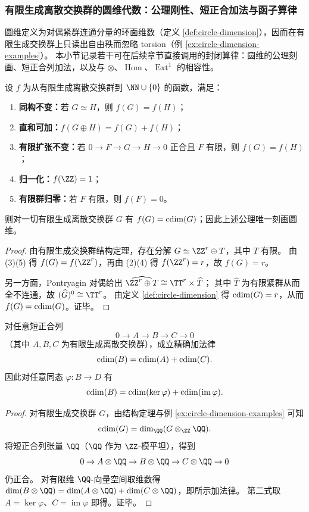 \subsubsection{有限生成离散交换群的圆维代数：公理刚性、短正合加法与函子算律}\label{subsubsec:cdim-fg-abelian-calculus}
圆维定义为对偶紧群连通分量的环面维数（定义 \ref{def:circle-dimension}），因而在有限生成交换群上只读出自由秩而忽略 torsion（例 \ref{ex:circle-dimension-examples}）。
本小节记录若干可在后续章节直接调用的封闭算律：圆维的公理刻画、短正合列加法，以及与 \(\otimes\)、\(\operatorname{Hom}\)、\(\operatorname{Ext}^1\) 的相容性。

\begin{theorem}[圆维的公理刚性与不可替代性]\label{thm:cdim-axiomatic-rigidity}
设 \(f\) 为从有限生成离散交换群到 \(\NN\cup\{0\}\) 的函数，满足：
\begin{enumerate}
  \item \textbf{同构不变：}若 \(G\simeq H\)，则 \(f(G)=f(H)\)；
  \item \textbf{直和可加：}\(f(G\oplus H)=f(G)+f(H)\)；
  \item \textbf{有限扩张不变：}若 \(0\to F\to G\to H\to 0\) 正合且 \(F\) 有限，则 \(f(G)=f(H)\)；
  \item \textbf{归一化：}\(f(\ZZ)=1\)；
  \item \textbf{有限群归零：}若 \(F\) 有限，则 \(f(F)=0\)。
\end{enumerate}
则对一切有限生成离散交换群 \(G\) 有 \(f(G)=\operatorname{cdim}(G)\)；因此上述公理唯一刻画圆维。
\end{theorem}
\begin{proof}
由有限生成交换群结构定理，存在分解 \(G\simeq \ZZ^{r}\oplus T\)，其中 \(T\) 有限。
由 (3)(5) 得 \(f(G)=f(\ZZ^{r})\)，再由 (2)(4) 得 \(f(\ZZ^{r})=r\)，故 \(f(G)=r\)。
\par
另一方面，Pontryagin 对偶给出 \(\widehat{\ZZ^{r}\oplus T}\cong \TT^{r}\times \widehat T\)；
其中 \(\widehat T\) 为有限紧群从而全不连通，故 \((\widehat G)^0\cong \TT^{r}\)。
由定义 \ref{def:circle-dimension} 得 \(\operatorname{cdim}(G)=r\)，从而 \(f(G)=\operatorname{cdim}(G)\)。证毕。
\end{proof}

\begin{theorem}[短正合列的圆维加法]\label{thm:cdim-short-exact-additivity}
对任意短正合列
\[
0\longrightarrow A\longrightarrow B\longrightarrow C\longrightarrow 0
\]
（其中 \(A,B,C\) 为有限生成离散交换群），成立精确加法律
\[
\operatorname{cdim}(B)=\operatorname{cdim}(A)+\operatorname{cdim}(C).
\]
因此对任意同态 \(\varphi:B\to D\) 有
\[
\operatorname{cdim}(B)=\operatorname{cdim}(\ker\varphi)+\operatorname{cdim}(\operatorname{im}\varphi).
\]
\end{theorem}
\begin{proof}
对有限生成交换群 \(G\)，由结构定理与例 \ref{ex:circle-dimension-examples} 可知
\[
\cdim(G)=\dim_{\QQ}(G\otimes_{\ZZ}\QQ).
\]
将短正合列张量 \(\QQ\)（\(\QQ\) 作为 \(\ZZ\)-模平坦），得到
\[
0\to A\otimes\QQ\to B\otimes\QQ\to C\otimes\QQ\to 0
\]
仍正合。
对有限维 \(\QQ\)-向量空间取维数得
\(\dim(B\otimes\QQ)=\dim(A\otimes\QQ)+\dim(C\otimes\QQ)\)，即所示加法律。
第二式取 \(A=\ker\varphi\)、\(C=\operatorname{im}\varphi\) 即得。证毕。
\end{proof}

